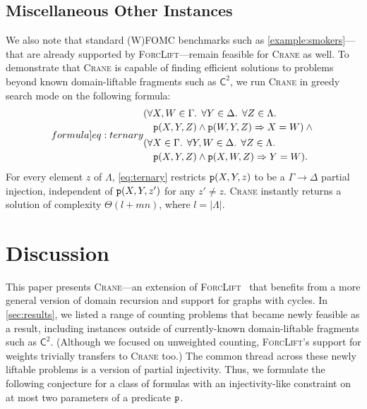 \documentclass{article}
\newcommand{\Ctwo}{$\mathsf{C}^{2}$}
\newcommand{\predicate}{\texttt{\textup{p}}}
\begin{document}
\subsection{Miscellaneous Other Instances}

We also note that standard (W)FOMC benchmarks such as
\cref{example:smokers}---that are already supported by
\textsc{ForcLift}---remain feasible for \textsc{Crane} as well. To demonstrate
that \textsc{Crane} is capable of finding efficient solutions to problems beyond
known domain-liftable fragments such as \Ctwo{}, we run \textsc{Crane} in greedy
search mode on the following formula:
\begin{equation}\label[formula]{eq:ternary}
  \begin{split}
    &\begin{multlined}[t]
      (\forall X,W \in \Gamma\text{. }\forall Y \in \Delta\text{. }\forall Z \in \Lambda\text{. }\\
      \predicate(X, Y, Z) \land \predicate(W, Y, Z) \Rightarrow X = W) \land{}
    \end{multlined}\\
    &\begin{multlined}[t]
      (\forall X \in \Gamma\text{. }\forall Y,W \in \Delta\text{. }\forall Z \in \Lambda\text{. }\\
      \predicate(X, Y, Z) \land \predicate(X, W, Z) \Rightarrow Y = W).
    \end{multlined}
  \end{split}
\end{equation}
For every element $z$ of $\Lambda$, \cref{eq:ternary} restricts
$\predicate(X, Y, z)$ to be a $\Gamma \to \Delta$ partial injection, independent
of $\predicate(X, Y, z')$ for any $z' \ne z$. \textsc{Crane} instantly returns a
solution of complexity $\Theta(l+mn)$, where $l = |\Lambda|$.

\section{Discussion}\label{sec:conclusion}
\setlength{\multlinegap}{0pt}

This paper presents \textsc{Crane}---an extension of
\textsc{ForcLift}~\cite{DBLP:conf/ijcai/BroeckTMDR11} that benefits from a more
general version of domain recursion and support for graphs with cycles. In
\cref{sec:results}, we listed a range of counting problems that became newly
feasible as a result, including instances outside of currently-known
domain-liftable fragments such as \Ctwo{}. (Although we focused on unweighted
counting, \textsc{ForcLift}'s support for weights trivially transfers to
\textsc{Crane} too.) The common thread across these newly liftable problems is a
version of partial injectivity. Thus, we formulate the following conjecture for
a class of formulas with an injectivity-like constraint on at most two
parameters of a predicate $\predicate$.
\end{document}
